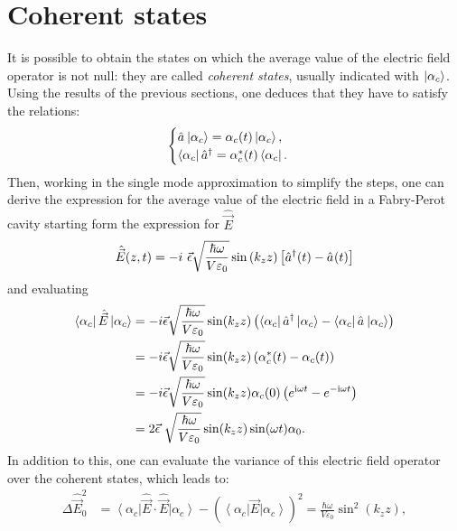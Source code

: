 \section{Coherent states}

It is possible to obtain the states on which the average value of the electric field operator is not null: they are called \textit{coherent states}, usually indicated with $\ket{\alpha_c}$. Using the results of the previous sections, one deduces that they have to satisfy the relations: 
\begin{equation}
    \begin{cases}
        \hat{a}_{} \ket{\alpha_c} = \alpha_c(t) \ket{\alpha_c}, \\
        \bra{\alpha_c} \hat{a}^{\dagger}_{} = \alpha_c^*(t) \bra{\alpha_c}.
    \end{cases}
\end{equation}
Then, working in the single mode approximation to simplify the steps, one can derive the expression for the average value of the electric field in a Fabry-Perot cavity starting form the expression for $\hat{\vec{E}}$ 
\begin{align}
 \hat{\Vec{E}}(z,t) = - i \ \Vec{\epsilon} \sqrt{\frac{\hbar \omega}{V \varepsilon_0}} \sin\left(k_z z\right) \left[\hat{a}^{\dagger}_{}(t) - \hat{a}_{}(t)\right]
\end{align}
and evaluating 
\begin{align*}
    \bra{ \alpha_c} \hat{\Vec{E}} \ket{\alpha_c} & =  - i \Vec{\epsilon} \sqrt{\frac{\hbar \omega}{V \varepsilon_0}} \sin(k_z z) \left(\bra{\alpha_c} \hat{a}^{\dagger}_{} \ket{\alpha_c} - \bra{\alpha_c} \hat{a}_{} \ket{ \alpha_c} \right) \\
    & = - i \Vec{\epsilon} \sqrt{\frac{\hbar \omega}{V \varepsilon_0}} \sin(k_z z) \left(\alpha_c^*(t) - \alpha_c(t)\right) \\
    & = -i  \Vec{\epsilon} \sqrt{\frac{\hbar \omega}{V \varepsilon_0}} \sin(k_z z) \alpha_c(0) \left(e^{\text{i} \omega t} - e^{- \text{i} \omega t}\right) \\
    & = 2 \Vec{\epsilon} \ \sqrt{\frac{\hbar \omega}{V \varepsilon_0}} \sin(k_z z) \sin(\omega t) \alpha_0. 
\end{align*}
In addition to this, one can evaluate the variance of this electric field operator over the coherent states, which leads to:
\begin{align}
    \Delta \hat{\vec{E}}_0^2 & = \left< \alpha_c \right| \hat{\Vec{E}} \cdot \hat{\Vec{E}}\left| \alpha_c \right> - \left( \left< \alpha_c \right| \Vec{E} \left| \alpha_c \right> \right)^2 = \frac{\hbar \omega}{V \varepsilon_0} \sin^2(k_z z), 
\end{align}
